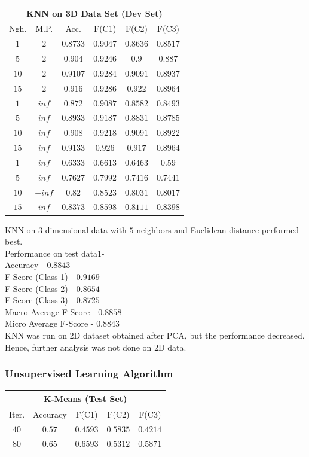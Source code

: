 \documentclass[12pt,journal,compsoc]{IEEEtran}
\begin{document}
\begin{center}
\vspace*{0.2 cm}
\begin{tabular}{|c|c|c|c|c|c|}
\multicolumn{6}{c}{KNN on 3D Data Set (Dev Set)}\\
\hline
Ngh. & M.P. & Acc. & F(C1) & F(C2) & F(C3)\\
\hline
$1$ &$2$ &$0.8733$ &$0.9047$ &$0.8636$ &$0.8517$\\
\hline
$5$ &$2$ &$0.904$ &$0.9246$ &$0.9$ &$0.887$\\
\hline
$10$ &$2$ &$0.9107$ &$0.9284$ &$0.9091$ &$0.8937$\\
\hline
$15$ &$2$ &$0.916$ &$0.9286$ &$0.922$ &$0.8964$\\
\hline
$1$ &$inf$ &$0.872$ &$0.9087$ &$0.8582$ &$0.8493$\\
\hline
$5$ &$inf$ &$0.8933$ &$0.9187$ &$0.8831$ &$0.8785$\\
\hline
$10$ &$inf$ &$0.908$ &$0.9218$ &$0.9091$ &$0.8922$\\
\hline
$15$ &$inf$ &$0.9133$ &$0.926$ &$0.917$ &$0.8964$\\
\hline
$1$ &$inf$ &$0.6333$ &$0.6613$ &$0.6463$ &$0.59$\\
\hline
$5$ &$inf$ &$0.7627$ &$0.7992$ &$0.7416$ &$0.7441$\\
\hline
$10$ &$-inf$ &$0.82$ &$0.8523$ &$0.8031$ &$0.8017$\\
\hline
$15$ &$inf$ &$0.8373$ &$0.8598$ &$0.8111$ &$0.8398$\\
\hline
\end{tabular}


\end{center}
KNN on $3$ dimensional data with $5$ neighbors and Euclidean distance performed best.\\
Performance on test data1-\\ 
Accuracy - $0.8843$\\ F-Score (Class 1) - $0.9169$\\
F-Score (Class 2) - $0.8654$\\ F-Score (Class 3) - $0.8725$\\ Macro Average F-Score - $0.8858$\\
Micro Average F-Score - $0.8843$\\
KNN was run on 2D dataset obtained after PCA, but the performance decreased. Hence, further analysis was not done on 2D data.
\subsubsection{Unsupervised Learning Algorithm}
\vspace*{0.1 cm}
\begin{center}
\begin{tabular}{|c|c|c|c|c|}
\multicolumn{5}{c}{K-Means (Test Set)}\\
\hline
Iter. & Accuracy & F(C1) & F(C2) & F(C3)\\
\hline
$40$ &$0.57$ &$0.4593$ &$0.5835$ &$0.4214$\\
\hline
$80$ &$0.65$ &$0.6593$ &$0.5312$ &$0.5871$\\
\hline
\end{tabular}
\end{center}
\end{document}
